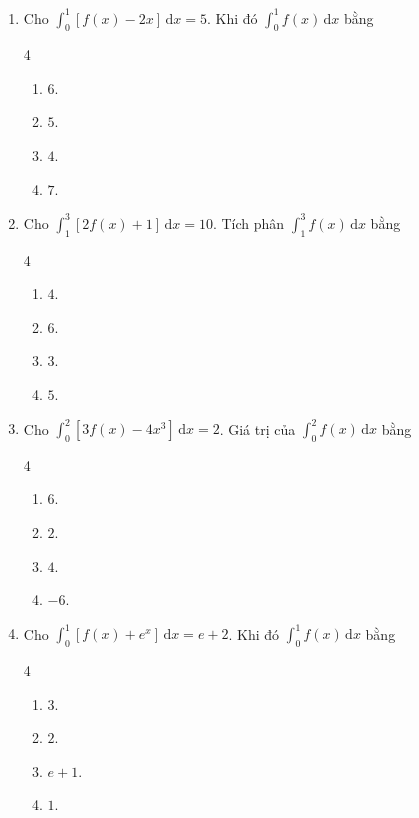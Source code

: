 \documentclass[12pt]{article}
\begin{document}
\begin{enumerate}[label=\textbf{Câu \arabic*.}]
		\item Cho $\displaystyle \int_0^1 [f(x) - 2x]\,\mathrm{d}x = 5$. Khi đó $\displaystyle \int_0^1 f(x)\,\mathrm{d}x$ bằng
		\begin{multicols}{4}
			\begin{enumerate}[label=\textbf{\Alph*.}]
				\item $6$.
				\item $5$.
				\item $4$.
				\item $7$.
			\end{enumerate}
		\end{multicols}
		
		\item Cho $\displaystyle \int_1^3 [2f(x) + 1]\,\mathrm{d}x = 10$. Tích phân $\displaystyle \int_1^3 f(x)\,\mathrm{d}x$ bằng
		\begin{multicols}{4}
			\begin{enumerate}[label=\textbf{\Alph*.}]
				\item $4$.
				\item $6$.
				\item $3$.
				\item $5$.
			\end{enumerate}
		\end{multicols}
		
		\item Cho $\displaystyle \int_0^2 [3f(x) - 4x^3]\,\mathrm{d}x = 2$. Giá trị của $\displaystyle \int_0^2 f(x)\,\mathrm{d}x$ bằng
		\begin{multicols}{4}
			\begin{enumerate}[label=\textbf{\Alph*.}]
				\item $6$.
				\item $2$.
				\item $4$.
				\item $-6$.
			\end{enumerate}
		\end{multicols}
		
		\item Cho $\displaystyle \int_0^1 [f(x) + e^x]\,\mathrm{d}x = e + 2$. Khi đó $\displaystyle \int_0^1 f(x)\,\mathrm{d}x$ bằng
		\begin{multicols}{4}
			\begin{enumerate}[label=\textbf{\Alph*.}]
				\item $3$.
				\item $2$.
				\item $e + 1$.
				\item $1$.
			\end{enumerate}
		\end{multicols}
		

\end{enumerate}
\end{document}
